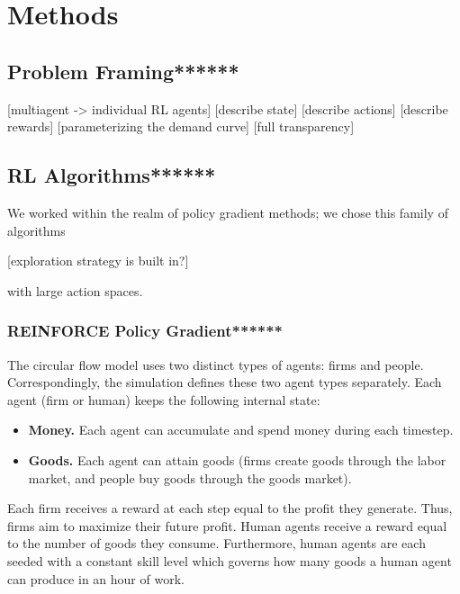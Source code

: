 \documentclass[twoside,twocolumn]{article}
\begin{document}
\section{Methods}
\subsection{Problem Framing******}

[multiagent -> individual RL agents]
[describe state]
[describe actions]
[describe rewards]
[parameterizing the demand curve]
[full transparency]



\subsection{RL Algorithms******}
We worked within the realm of policy gradient methods; we chose this family of algorithms 

[exploration strategy is built in?]



with large action spaces.


\subsubsection{REINFORCE Policy Gradient******}



The circular flow model uses two distinct types of agents: firms and people. Correspondingly, the simulation defines these two agent types separately. Each agent (firm or human) keeps the following internal state:
\begin{itemize}
  \item \textbf{Money.} Each agent can accumulate and spend money during each timestep.
  \item \textbf{Goods.} Each agent can attain goods (firms create goods through the labor market, and people buy goods through the goods market).
\end{itemize}
Each firm receives a reward at each step equal to the profit they generate. Thus, firms aim to maximize their future profit. Human agents receive a reward equal to the number of goods they consume. Furthermore, human agents are each seeded with a constant skill level which governs how many goods a human agent can produce in an hour of work.

\medskip
\end{document}
